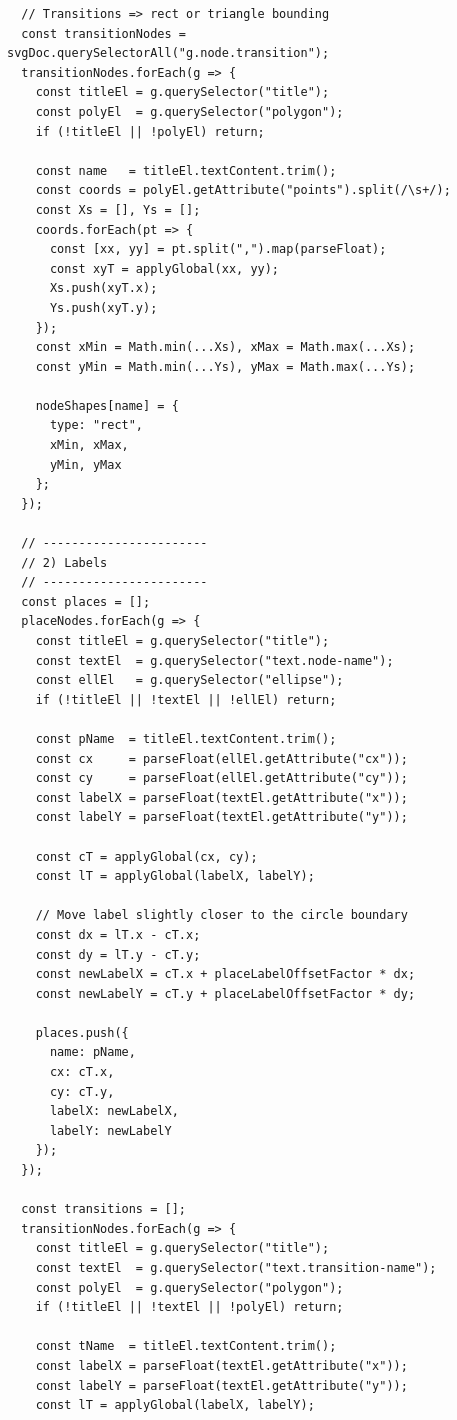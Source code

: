 \begin{verbatim}
  // Transitions => rect or triangle bounding
  const transitionNodes = svgDoc.querySelectorAll("g.node.transition");
  transitionNodes.forEach(g => {
    const titleEl = g.querySelector("title");
    const polyEl  = g.querySelector("polygon");
    if (!titleEl || !polyEl) return;

    const name   = titleEl.textContent.trim();
    const coords = polyEl.getAttribute("points").split(/\s+/);
    const Xs = [], Ys = [];
    coords.forEach(pt => {
      const [xx, yy] = pt.split(",").map(parseFloat);
      const xyT = applyGlobal(xx, yy);
      Xs.push(xyT.x);
      Ys.push(xyT.y);
    });
    const xMin = Math.min(...Xs), xMax = Math.max(...Xs);
    const yMin = Math.min(...Ys), yMax = Math.max(...Ys);

    nodeShapes[name] = {
      type: "rect",
      xMin, xMax,
      yMin, yMax
    };
  });

  // -----------------------
  // 2) Labels
  // -----------------------
  const places = [];
  placeNodes.forEach(g => {
    const titleEl = g.querySelector("title");
    const textEl  = g.querySelector("text.node-name");
    const ellEl   = g.querySelector("ellipse");
    if (!titleEl || !textEl || !ellEl) return;

    const pName  = titleEl.textContent.trim();
    const cx     = parseFloat(ellEl.getAttribute("cx"));
    const cy     = parseFloat(ellEl.getAttribute("cy"));
    const labelX = parseFloat(textEl.getAttribute("x"));
    const labelY = parseFloat(textEl.getAttribute("y"));

    const cT = applyGlobal(cx, cy);
    const lT = applyGlobal(labelX, labelY);

    // Move label slightly closer to the circle boundary
    const dx = lT.x - cT.x;
    const dy = lT.y - cT.y;
    const newLabelX = cT.x + placeLabelOffsetFactor * dx;
    const newLabelY = cT.y + placeLabelOffsetFactor * dy;

    places.push({
      name: pName,
      cx: cT.x,
      cy: cT.y,
      labelX: newLabelX,
      labelY: newLabelY
    });
  });

  const transitions = [];
  transitionNodes.forEach(g => {
    const titleEl = g.querySelector("title");
    const textEl  = g.querySelector("text.transition-name");
    const polyEl  = g.querySelector("polygon");
    if (!titleEl || !textEl || !polyEl) return;

    const tName  = titleEl.textContent.trim();
    const labelX = parseFloat(textEl.getAttribute("x"));
    const labelY = parseFloat(textEl.getAttribute("y"));
    const lT = applyGlobal(labelX, labelY);


\end{verbatim}
